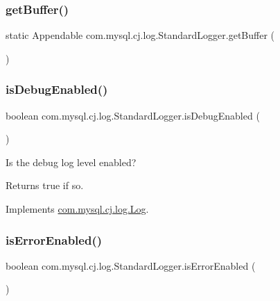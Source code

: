 \subsubsection{\texorpdfstring{get\+Buffer()}{getBuffer()}}
{\footnotesize\ttfamily static Appendable com.\+mysql.\+cj.\+log.\+Standard\+Logger.\+get\+Buffer (\begin{DoxyParamCaption}{ }\end{DoxyParamCaption})\hspace{0.3cm}{\ttfamily [static]}}

\mbox{\label{classcom_1_1mysql_1_1cj_1_1log_1_1_standard_logger_ae2a40a552ba3dec4a358cecb436341a3}} 
\subsubsection{\texorpdfstring{is\+Debug\+Enabled()}{isDebugEnabled()}}
{\footnotesize\ttfamily boolean com.\+mysql.\+cj.\+log.\+Standard\+Logger.\+is\+Debug\+Enabled (\begin{DoxyParamCaption}{ }\end{DoxyParamCaption})}

Is the \textquotesingle{}debug\textquotesingle{} log level enabled?

\begin{DoxyReturn}{Returns}
true if so. 
\end{DoxyReturn}


Implements \mbox{\hyperlink{interfacecom_1_1mysql_1_1cj_1_1log_1_1_log_a8340f13152932af117ec2f5884c06dd3}{com.\+mysql.\+cj.\+log.\+Log}}.

\mbox{\label{classcom_1_1mysql_1_1cj_1_1log_1_1_standard_logger_ab2e1961de9eba2577b779cb970abc000}} 
\subsubsection{\texorpdfstring{is\+Error\+Enabled()}{isErrorEnabled()}}
{\footnotesize\ttfamily boolean com.\+mysql.\+cj.\+log.\+Standard\+Logger.\+is\+Error\+Enabled (\begin{DoxyParamCaption}{ }\end{DoxyParamCaption})}


